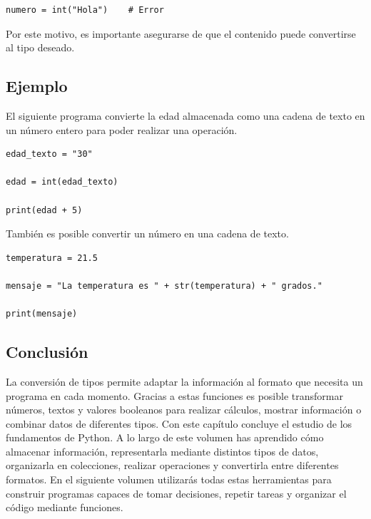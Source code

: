 \documentclass[11pt,a5paper,twoside]{book}
\begin{document}
\begin{tcolorbox}
\scriptsize
 \begin{verbatim}
numero = int("Hola")    # Error
\end{verbatim}
\end{tcolorbox}
Por este motivo, es importante asegurarse de que el contenido puede convertirse al tipo deseado.
\subsection{Ejemplo}
El siguiente programa convierte la edad almacenada como una cadena de texto en un número entero para poder realizar una operación.


\begin{tcolorbox}
\scriptsize
 \begin{verbatim}
edad_texto = "30"

edad = int(edad_texto)

print(edad + 5)
\end{verbatim}
\end{tcolorbox}
También es posible convertir un número en una cadena de texto.


\begin{tcolorbox}
\scriptsize
 \begin{verbatim}
temperatura = 21.5

mensaje = "La temperatura es " + str(temperatura) + " grados."

print(mensaje)
\end{verbatim}
\end{tcolorbox}
\subsection{Conclusión}
La conversión de tipos permite adaptar la información al formato que necesita un programa en cada momento. Gracias a estas funciones es posible transformar números, textos y valores booleanos para realizar cálculos, mostrar información o combinar datos de diferentes tipos.
Con este capítulo concluye el estudio de los fundamentos de Python. A lo largo de este volumen has aprendido cómo almacenar información, representarla mediante distintos tipos de datos, organizarla en colecciones, realizar operaciones y convertirla entre diferentes formatos.
En el siguiente volumen utilizarás todas estas herramientas para construir programas capaces de tomar decisiones, repetir tareas y organizar el código mediante funciones.

\newpage
\end{document}
